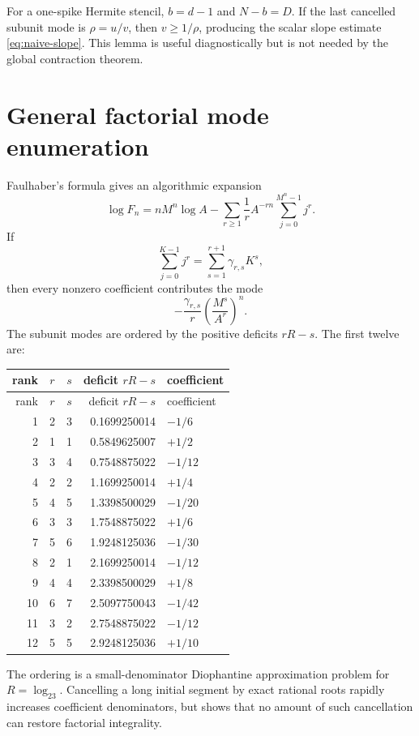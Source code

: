 \documentclass[11pt,oneside]{article}
\theoremstyle{definition}
\theoremstyle{remark}
\begin{document}
For a one-spike Hermite stencil, $b=d-1$ and $N-b=D$.  If the last cancelled subunit mode is
$\rho=u/v$, then $v\ge1/\rho$, producing the scalar slope estimate
\eqref{eq:naive-slope}.  This lemma is useful diagnostically but is not needed by the global
contraction theorem.

\section{General factorial mode enumeration}
\label{app:modes}

Faulhaber's formula gives an algorithmic expansion
\[
 \log F_n=nM^n\log A
 -\sum_{r\ge1}\frac1rA^{-rn}\sum_{j=0}^{M^n-1}j^r.
\]
If
\[
 \sum_{j=0}^{K-1}j^r=\sum_{s=1}^{r+1}\gamma_{r,s}K^s,
\]
then every nonzero coefficient contributes the mode
\[
 -\frac{\gamma_{r,s}}r\left(\frac{M^s}{A^r}\right)^n.
\]
The subunit modes are ordered by the positive deficits $rR-s$.  The first twelve are:

\begin{longtable}{@{\extracolsep{\fill}}rcrrl@{}}
\toprule
rank & $r$ & $s$ & deficit $rR-s$ & coefficient\\
\midrule
\endfirsthead
\toprule
rank & $r$ & $s$ & deficit $rR-s$ & coefficient\\
\midrule
\endhead
1&2&3&0.1699250014&$-1/6$\\
2&1&1&0.5849625007&$+1/2$\\
3&3&4&0.7548875022&$-1/12$\\
4&2&2&1.1699250014&$+1/4$\\
5&4&5&1.3398500029&$-1/20$\\
6&3&3&1.7548875022&$+1/6$\\
7&5&6&1.9248125036&$-1/30$\\
8&2&1&2.1699250014&$-1/12$\\
9&4&4&2.3398500029&$+1/8$\\
10&6&7&2.5097750043&$-1/42$\\
11&3&2&2.7548875022&$-1/12$\\
12&5&5&2.9248125036&$+1/10$\\
\bottomrule
\end{longtable}

The ordering is a small-denominator Diophantine approximation problem for $R=\log_23$.
Cancelling a long initial segment by exact rational roots rapidly increases coefficient
denominators, but  shows that no amount of such cancellation can
restore factorial integrality.
\end{document}
